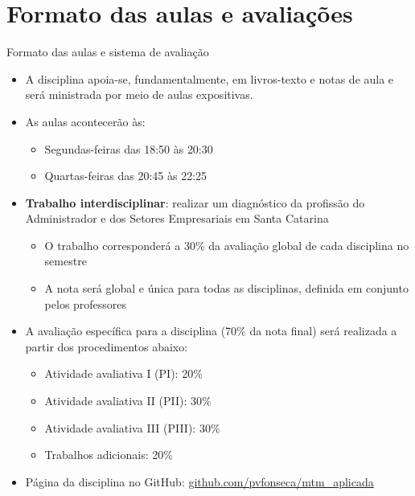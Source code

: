 \documentclass[10pt]{beamer}
\begin{document}
\section{Formato das aulas e avaliações}
\begin{frame}{Formato das aulas e sistema de avaliação}
    \begin{itemize}
        \item A disciplina apoia-se, fundamentalmente, em livros-texto e notas de aula e será ministrada por meio de aulas expositivas.\bigskip

        \item As aulas acontecerão às:
              \begin{itemize}
                  \item Segundas-feiras das 18:50 às 20:30
                  \item Quartas-feiras das 20:45 às 22:25\bigskip
              \end{itemize}
        
        \item \textbf{Trabalho interdisciplinar}: realizar um diagnóstico da profissão do Administrador e dos Setores Empresariais em Santa Catarina
        \begin{itemize}
            \item O trabalho corresponderá a 30\% da avaliação global de cada disciplina no semestre \medskip
            \item A nota será global e única para todas as disciplinas, definida em conjunto pelos professores
        \end{itemize}

        \item A avaliação específica para a disciplina (70\% da nota final) será realizada a partir dos procedimentos abaixo:
              \begin{itemize}
                  \item Atividade avaliativa I (PI): 20\%
                  \item Atividade avaliativa II (PII): 30\%
                  \item Atividade avaliativa III (PIII): 30\%
                  \item Trabalhos adicionais: 20\%\bigskip
              \end{itemize}

        \item Página da disciplina no GitHub: \href{https://github.com/pvfonseca/mtm\_aplicada}{github.com/pvfonseca/mtm\_aplicada}
    \end{itemize}
\end{frame}
\end{document}
